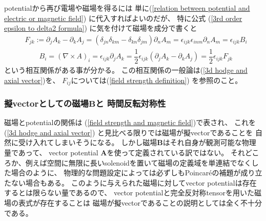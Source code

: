 potentialから再び電場や磁場を得るには
単に(\ref{relation between potential and electric or magnetic field})
に代入すればよいのだが、
特に公式
(\ref{3rd order epsilon to delta2 formula})
に気を付けて磁場を成分で書くと
\begin{subequations}
\begin{align}
  & F_{jk} :=
  \partial_j A_k - \partial_k A_j
=
  (\delta_{jn} \delta_{km}
  - \delta_{kn} \delta_{jm})
  \partial_n A_m
=
  \epsilon_{ijk} \epsilon_{inm}
  \partial_n A_m
=
  \epsilon_{ijk} B_i
\\
  & \qquad B_i =
  (\nabla \times A)_i =
  \epsilon_{ijk} \partial_j A_k
=
  \dfrac{1}{2}
  \epsilon_{ijk}
  ( \partial_j A_k
  - \partial_k A_j )
=
  \dfrac{1}{2}
  \epsilon_{ijk}
  F_{jk}
\end{align}
\label{field strength and magnetic field}
\end{subequations}
という相互関係がある事が分かる。
この相互関係の一般論は(\ref{3d hodge and axial vector})を、
$F_{ij}$については(\ref{field strength definition})
を参照のこと。

\subsubsection{擬vectorとしての磁場$\bm{B}$と
時間反転対称性}

磁場とpotentialの関係は
(\ref{field strength and magnetic field})で表され、
これを(\ref{3d hodge and axial vector})
と見比べる限りでは磁場が擬vectorであることを
自然に受け入れてしまいそうになる。
しかし磁場$\bm{B}$はそれ自身が観測可能な物理量であって、
vector potential $\bm{A}$を使って定義されている訳ではない。
それどころか、例えば空間に無限に長いsolenoidを置いて磁場の定義域を単連結でなくした場合のように、
物理的な問題設定によっては必ずしもPoincar\'eの補題が成り立たない場合もある。
このように与えられた磁場に対してvector potentialは存在するとは限らない量であるので、
vector potentialと完全反対称tensorを用いた磁場の表式が存在することは
磁場が擬vectorであることの説明としては全く不十分である。

